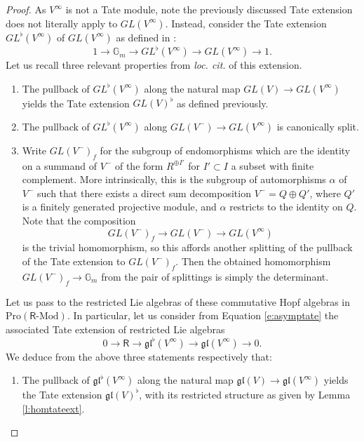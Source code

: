 \documentclass{amsart}
\theoremstyle{definition}
\newcommand{\gl}{\mathfrak{gl}}
\newcommand{\Pro}{\on{Pro}}
\renewcommand{\mod}{\text{-}\on{Mod}}
\newcommand{\on}{\mathrm}
\newcommand{\Ring}{\mathsf{R}}
\numberwithin{equation}{section}
\begin{document}
{\begin{proof}
As $V^\infty$ is not a Tate module, note the previously discussed Tate extension does not literally apply to $GL(V^\infty)$. Instead, consider the Tate extension $GL^\flat(V^\infty)$ of $GL(V^\infty)$ as defined in \cite[Section 2.10]{BBE}:
\begin{equation} \label{e:asymptate}1 \rightarrow \mathbb{G}_m \rightarrow GL^\flat(V^\infty) \rightarrow GL(V^\infty) \rightarrow 1.\end{equation}
Let us recall three relevant properties from {\em loc. cit.} of this extension. 

\begin{enumerate}
\item The pullback of $GL^\flat(V^\infty)$ along the natural map $GL(V) \rightarrow GL(V^\infty)$ yields the Tate extension $GL(V)^\flat$ as defined previously.

\item The pullback of $GL^\flat(V^\infty)$ along $GL(V^-) \rightarrow GL(V^\infty)$ is canonically split. 

\item Write $GL(V^-)_f$ for the subgroup of endomorphisms which are the identity on a summand of $V^-$ of the form $R^{\oplus I'}$ for $I' \subset I$ a subset with finite complement. More intrinsically, this is the subgroup of automorphisms $\alpha$ of $V^-$ such that there exists a direct sum decomposition $V^- = Q \oplus Q'$, where $Q'$ is a finitely generated projective module, and $\alpha$ restricts to the identity on $Q$. Note that the composition $$GL(V^-)_f \rightarrow GL(V^-) \rightarrow GL(V^\infty)$$ is the trivial homomorphism, so this affords another splitting of the pullback of the Tate extension to $GL(V^-)_f$. Then the obtained homomorphism $GL(V^-)_f \rightarrow \mathbb{G}_m$ from the pair of splittings  is simply the determinant. 
\end{enumerate}

Let us pass to the restricted Lie algebras of these commutative Hopf algebras in $\Pro(\Ring\mod)$. In particular, let us consider from Equation \eqref{e:asymptate} the associated Tate extension of restricted Lie algebras
$$0 \rightarrow \Ring \rightarrow \gl^\flat(V^\infty) \rightarrow \gl(V^\infty) \rightarrow 0.$$
We deduce from the above three statements respectively that:
\begin{enumerate}
\item[(1$'$)] The pullback of $\gl^\flat(V^\infty)$ along the natural map $\gl(V) \rightarrow \gl(V^\infty)$ yields the Tate extension $\gl(V)^\flat$, with its restricted structure as given by Lemma \ref{l:homtateext}. 


\end{enumerate}
\end{proof}}
\end{document}
